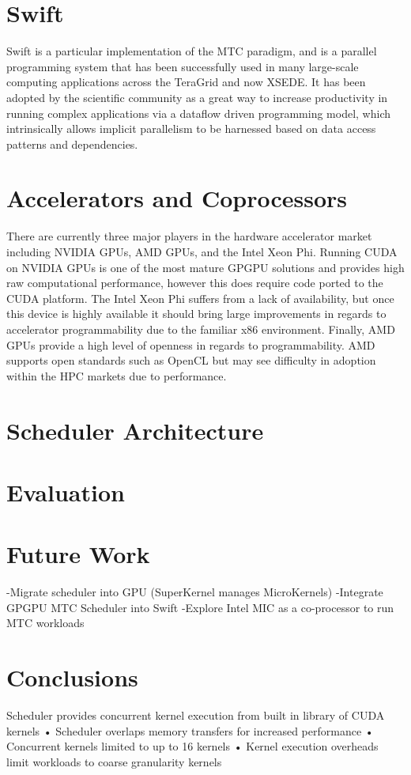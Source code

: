 \documentclass[conference]{IEEEtran}
\begin{document}
\section{Swift}
Swift is a particular implementation of the MTC paradigm, and is a parallel programming system that has been successfully used in many large-scale computing applications across the TeraGrid and now XSEDE. It has been adopted by the scientific community as a great way to increase productivity in running complex applications via a dataflow driven programming model, which intrinsically allows implicit parallelism to be harnessed based on data access patterns and dependencies.

\section{Accelerators and Coprocessors}
There are currently three major players in the hardware accelerator market including NVIDIA GPUs, AMD GPUs, and the Intel Xeon Phi. Running CUDA on NVIDIA GPUs is one of the most mature GPGPU solutions and provides high raw computational performance, however this does require code ported to the CUDA platform. The Intel Xeon Phi suffers from a lack of availability, but once this device is highly available it should bring large improvements in regards to accelerator programmability due to the familiar x86 environment. Finally, AMD GPUs provide a high level of openness in regards to programmability. AMD supports open standards such as OpenCL but may see difficulty in adoption within the HPC markets due to performance.\cite{kriederGCASR12}

\section{Scheduler Architecture}

\section{Evaluation}

\section{Future Work}
-Migrate scheduler into GPU (SuperKernel manages MicroKernels)
-Integrate GPGPU MTC Scheduler into Swift
-Explore Intel MIC as a co-processor to run MTC 
workloads

\section{Conclusions}
Scheduler provides concurrent kernel execution from built in library of CUDA kernels • Scheduler overlaps memory transfers for increased performance • Concurrent kernels limited to up to 16 kernels • Kernel execution overheads limit workloads to coarse granularity kernels



\end{document}

